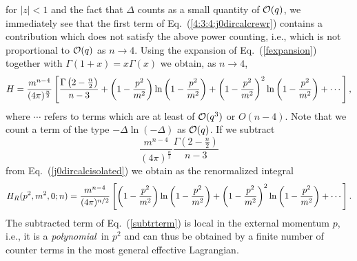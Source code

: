 \documentclass[twoside,12pt]{article}
\begin{document}
for $|z|<1$ and the fact that $\Delta$ counts as a small quantity of
${\cal O}(q)$, we immediately see that the first term of
Eq.\ (\ref{4:3:4:j0dircalcrewr}) contains a contribution which does not
satisfy the above power counting, i.e., which is not proportional
to ${\cal O}(q)$ as $n\to 4$.
   Using the expansion of Eq.\ (\ref{fexpansion}) together with
$\Gamma(1+x)=x\Gamma(x)$ we obtain, as $n\to 4$,
\begin{equation}
H=\frac{m^{n-4}}{(4\pi )^{\frac{n}{2}}}
\left[\frac{\Gamma \left(2-\frac{n}{2}\right)}{n-3}
+\left( 1-{p^2\over m^2}\right)\ln \left( 1-{p^2\over m^2}
\right)+
\left( 1-{p^2\over m^2}\right)^2\ln \left( 1-{p^2\over m^2}\right)
+\cdots\right],
\label{j0dircalcisolated}
\end{equation}
where $\cdots$ refers to terms which are at least of ${\cal O}(q^3)$
or $O(n-4)$.
   Note that we count a term of the type $-\Delta \ln(-\Delta)$ as ${\cal O}(q)$.
   If we subtract
\begin{equation}
\label{subtraction}
\frac{m^{n-4}}{(4\pi )^{\frac{n}{2}}}
\frac{\Gamma \left( 2-\frac{n}{2}\right)}{n-3}
\label{subtrterm}
\end{equation}
from Eq.\ (\ref{j0dircalcisolated}) we obtain as the renormalized integral
\begin{equation}
H_R(p^2,m^2,0;n)={m^{n-4}\over (4\pi )^{n/2}}\left[ \left( 1-{p^2\over m^2}
\right)
\ln \left( 1-{p^2\over m^2}\right)+
\left( 1-{p^2\over m^2}\right)^2\ln \left( 1-{p^2\over m^2}\right)
+\cdots\right].
\label{j0ren}
\end{equation}
   The subtracted term of Eq.\ (\ref{subtrterm}) is local in the external
momentum $p$, i.e., it is a {\em polynomial}\, in $p^2$
and can thus be obtained by a finite number of counter terms in the
most general effective Lagrangian.
\end{document}
